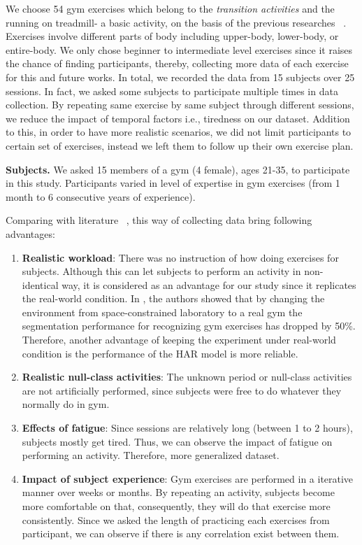 \documentclass[journal,article,submit,moreauthors,pdftex]{Definitions/mdpi}
\begin{document}
We choose 54 gym exercises which belong to the \textit{transition activities} and the running on treadmill- a basic activity, on the basis of the previous researches ~\cite{}. Exercises involve different parts of body including upper-body, lower-body, or entire-body. We only chose beginner to intermediate level exercises since it raises the chance of finding participants, thereby, collecting more data of each exercise for this and future works. 
In total, we recorded the data from 15 subjects over 25 sessions. In fact, we asked some subjects to participate multiple times in data collection. By repeating same exercise by same subject through different sessions, we reduce the impact of temporal factors i.e., tiredness on our dataset.
Addition to this, in order to have more realistic scenarios, we did not limit participants to certain set of exercises, instead we left them to follow up their own exercise plan.

\noindent \textbf{Subjects.} We asked 15 members of a gym (4 female), ages 21-35, to participate in this study. Participants varied in level of expertise in gym exercises (from 1 month to 6 consecutive years of experience). 

Comparing with literature ~\cite{morris2014recofit, soro2019recognition, s140610146, anguita2013public}, this way of collecting data bring following advantages:

\begin{enumerate}
	
	\item \textbf{Realistic workload}: There was no instruction of how doing exercises for subjects. Although this can let subjects to perform an activity in non-identical way, it is considered as an advantage for our study since it replicates the real-world condition. In \cite{morris2014recofit}, the authors showed that by changing the environment from space-constrained laboratory to a real gym the segmentation performance for recognizing gym exercises has dropped by 50\%. Therefore, another advantage of keeping the experiment under real-world condition is the performance of the HAR model is more reliable.	
	\item \textbf{Realistic null-class activities}:	The unknown period or null-class activities are not artificially performed, since subjects were free to do whatever they normally do in gym.	
	\item \textbf{Effects of fatigue}: Since sessions are relatively long (between 1 to 2 hours), subjects mostly get tired. Thus, we can observe the impact of fatigue on performing an activity. Therefore, more generalized dataset.
	
	\item \textbf{Impact of subject experience}: Gym exercises are performed in a iterative manner over weeks or months. By repeating an activity, subjects become more comfortable on that, consequently, they will do that exercise more consistently. Since we asked the length of practicing each exercises from participant, we can observe if there is any correlation exist between them.
\end{enumerate}
\end{document}
